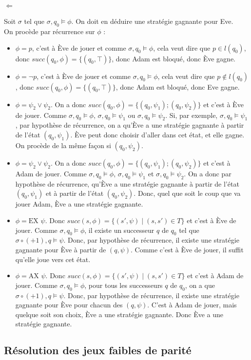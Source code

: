 \documentclass[10pt,a4paper]{article}
\begin{document}
\paragraph{$\Longleftarrow$}
Soit $\sigma$ tel que $\sigma,q_0 \vDash \phi$. On doit en déduire une stratégie gagnante pour Eve.\\
On procède par récurrence sur $\phi$ :
\begin{itemize}
\item $\phi = p$, c'est à Ève de jouer et comme $\sigma,q_0 \vDash \phi$, cela veut dire que $p \in l(q_0)$, donc $succ(q_0,\phi) = \{(q_0, \top)\}$, donc Adam est bloqué, donc Ève gagne.
\item $\phi = \neg p$, c'est à Ève de jouer et comme $\sigma,q_0 \vDash \phi$, cela veut dire que $p \notin l(q_0)$, donc $succ(q_0,\phi) = \{(q_0, \top)\}$, donc Adam est bloqué, donc Eve gagne.

\item $\phi = \psi_2 \lor \psi_2$. On a donc $succ(q_0,\phi) = \{(q_0, \psi_1); (q_0, \psi_2) \}$ et c'est à Ève de jouer. Comme $\sigma,q_0 \vDash \phi$, $\sigma,q_0 \vDash \psi_1$ ou $\sigma,q_0 \vDash \psi_2$. Si, par exemple, $\sigma,q_0 \vDash \psi_1$, par hypothèse de récurrence, on a qu'Ève a une stratégie gagnante à partir de l'état $(q_0, \psi_1)$. Ève peut donc choisir d'aller dans cet état, et elle gagne. On procède de la même façon si $(q_0, \psi_2)$.

\item $\phi = \psi_2 \lor \psi_2$. On a donc $succ(q_0,\phi) = \{(q_0, \psi_1); (q_0, \psi_2) \}$ et c'est à Adam de jouer. Comme $\sigma,q_0 \vDash \phi$, $\sigma,q_0 \vDash \psi_1$ et $\sigma,q_0 \vDash \psi_2$. On a donc par hypothèse de récurrence, qu'Ève a une stratégie gagnante à partir de l'état $(q_0, \psi_1)$ et à partir de l'état $(q_0, \psi_2)$. Donc, quel que soit le coup que va jouer Adam, Ève a une stratégie gagnante.

\item $\phi = \mbox{EX } \psi$. Donc $succ(s, \phi) = \{ (s', \psi) \mid (s,s') \in T \} $ et c'est à Ève de jouer. Comme $\sigma,q_0 \vDash \phi$, il existe un successeur $q$ de $q_0$ tel que $\sigma\circ (+ 1),q \vDash \psi$. Donc, par hypothèse de récurrence, il existe une stratégie gagnante pour Ève à partir de $(q, \psi)$. Comme c'est à Ève de jouer, il suffit qu'elle joue vers cet état.

\item $\phi = \mbox{AX } \psi$. Donc $succ(s, \phi) = \{ (s', \psi) \mid (s,s') \in T \} $ et c'est à Adam de jouer. Comme $\sigma,q_0 \vDash \phi$, pour tous les successeurs $q$ de $q_0$, on a que $\sigma\circ (+ 1),q \vDash \psi$. Donc, par hypothèse de récurrence, il existe une stratégie gagnante pour Ève pour chacun des $(q, \psi)$. C'est à Adam de jouer, mais quelque soit son choix, Ève a une stratégie gagnante. Donc Ève a une stratégie gagnante.
\end{itemize}
\subsection{Résolution des jeux faibles de parité}
\end{document}
